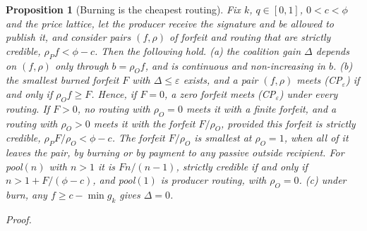 \documentclass[11pt]{article}
\newtheorem{proposition}{Proposition}
\begin{document}
\begin{proposition}[Burning is the cheapest routing]\label{prop:route}
Fix $k$, $q\in[0,1]$, $0<c<\phi$ and the price lattice, let the producer receive the signature and be allowed to publish it, and consider pairs $(f,\rho)$ of forfeit and routing that are strictly credible, $\rho_P f<\phi-c$. Then the following hold.
(a) the coalition gain $\Delta$ depends on $(f,\rho)$ only through $b=\rho_O f$, and is continuous and non-increasing in $b$.
(b) the smallest burned forfeit $F$ with $\Delta\le\varepsilon$ exists, and a pair $(f,\rho)$ meets (CP$_\varepsilon$) if and only if $\rho_O f\ge F$. Hence, if $F=0$, a zero forfeit meets (CP$_\varepsilon$) under every routing. If $F>0$, no routing with $\rho_O=0$ meets it with a finite forfeit, and a routing with $\rho_O>0$ meets it with the forfeit $F/\rho_O$, provided this forfeit is strictly credible, $\rho_P F/\rho_O<\phi-c$. The forfeit $F/\rho_O$ is smallest at $\rho_O=1$, when all of it leaves the pair, by burning or by payment to any passive outside recipient. For pool$(n)$ with $n>1$ it is $Fn/(n-1)$, strictly credible if and only if $n>1+F/(\phi-c)$, and pool$(1)$ is producer routing, with $\rho_O=0$.
(c) under burn, any $f\ge c-\min g_k$ gives $\Delta=0$.
\end{proposition}
\emph{Proof.}
\end{document}
